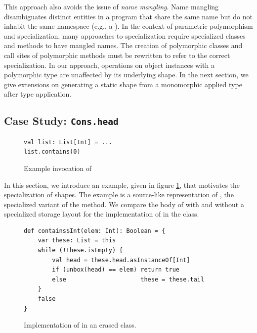This approach also avoids the issue of \textit{name mangling}.
Name mangling disambiguates distinct entities in a program that share the same name but do not inhabit the same namespace (e.g., a ).
In the context of parametric polymorphism and specialization, many approaches to specialization require specialized classes and methods to have mangled names.
The creation of polymorphic classes and call sites of polymorphic methods must be rewritten to refer to the correct specialization.
In our approach, operations on object instances with a polymorphic type are unaffected by its underlying shape.
In the next section, we give extensions on generating a static shape from a monomorphic applied type after type application.

\subsection{Case Study: \texttt{Cons.head}}

\begin{figure}[!htb]
\begin{verbatim}
val list: List[Int] = ...
list.contains(0)
\end{verbatim}
\caption{Example invocation of }
\label{example:list-contains-example}
\end{figure}

In this section, we introduce an example, given in figure \ref{example:list-contains-example}, that motivates the specialization of shapes.
The example is a source-like representation of , the specialized variant of the  method.
We compare the body of  with and without a specialized storage layout for the implementation of  in the  class.

\begin{figure}[!htb]
\begin{verbatim}
def contains$Int(elem: Int): Boolean = {
	var these: List = this
	while (!these.isEmpty) {
		val head = these.head.asInstanceOf[Int]
		if (unbox(head) == elem) return true
		else                     these = these.tail
	}
	false
}	
\end{verbatim}
\caption{Implementation of  in an erased  class.}
\label{impl:cons-contains-erased}
\end{figure}


